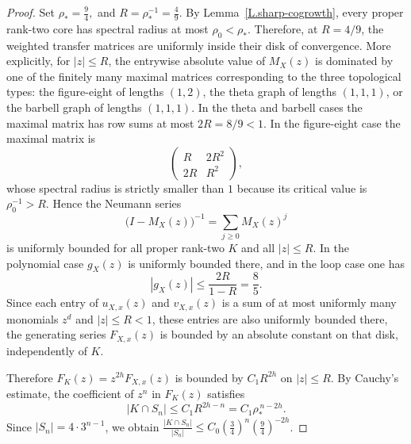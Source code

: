 \documentclass[10pt,a4paper]{amsart}
\begin{document}
\begin{proof}
Set
$
\rho_*=\frac94,
$ and
$       R=\rho_*^{-1}=\frac49.$
By Lemma~\ref{L.sharp-cogrowth}, every proper rank-two core has spectral radius
at most $\rho_0<\rho_*$.  Therefore, at $R=4/9$, the weighted transfer matrices
are uniformly inside their disk of convergence.  More explicitly, for
$|z|\leq R$, the entrywise absolute value of $M_X(z)$ is dominated by one of the
finitely many maximal matrices corresponding to the three topological types: the
figure-eight of lengths $(1,2)$, the theta graph of lengths $(1,1,1)$, or the
barbell graph of lengths $(1,1,1)$.  In the theta and barbell cases the maximal
matrix has row sums at most $2R=8/9<1$.  In the figure-eight case the maximal
matrix is
\[
        \begin{pmatrix}
                R & 2R^2 \\
                2R & R^2
        \end{pmatrix},
\]
whose spectral radius is strictly smaller than $1$ because its critical value is
$\rho_0^{-1}>R$.  Hence the Neumann series
\[
        \bigl(I-M_X(z)\bigr)^{-1}=\sum_{j\geq 0} M_X(z)^j
\]
is uniformly bounded for all proper rank-two $K$ and all $|z|\leq R$.
In the polynomial case $g_X(z)$ is uniformly bounded there, and in the loop case
one has
\[
        |g_X(z)|\leq \frac{2R}{1-R}=\frac{8}{5}.
\]
Since each entry of $u_{X,x}(z)$ and $v_{X,x}(z)$ is a sum of at most uniformly many
monomials $z^d$ and $|z|\leq R<1$, these entries are also uniformly bounded
there,
the generating series $F_{X,x}(z)$ is bounded by an absolute constant on that disk,
independently of $K$.

Therefore $F_K(z)=z^{2h}F_{X,x}(z)$ is bounded by $C_1R^{2h}$ on $|z|\leq R$.
By Cauchy's estimate, the coefficient of $z^n$ in $F_K(z)$ satisfies
\[
        |K\cap S_n|\leq C_1 R^{2h-n}=C_1 \rho_*^{\,n-2h}.
\]
Since $|S_n|=4\cdot 3^{n-1}$, we obtain
$\frac{|K\cap S_n|}{|S_n|}\leq C_0\left(\frac34\right)^n\left(\frac94\right)^{-2h}$.
\end{proof}
\end{document}
